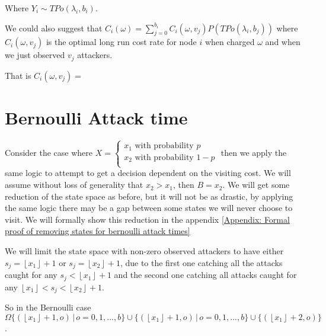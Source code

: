 \documentclass[a4paper,10pt]{article}
\newcommand{\floor}[1]{\left \lfloor #1 \right \rfloor}
\theoremstyle{definition}
\theoremstyle{definition}
\theoremstyle{remark}
\theoremstyle{definition}
\begin{document}
Where $Y_{i} \sim TPo(\lambda_{i},b_{i})$.

We could also suggest that $C_{i}(\omega)=\sum\limits_{j=0}^{b_{i}} C_{i}(\omega,v_{j}) P(TPo(\lambda_{i},b_{j}))$ where $C_{i}(\omega,v_{j})$ is the optimal long run cost rate for node $i$ when charged $\omega$ and when we just observed $v_{j}$ attackers.

That is $C_{i}(\omega,v_{j})=$

\section{Bernoulli Attack time}
Consider the case where $X=\begin{cases}
x_{1} \text{ with probability } p \\
x_{2} \text{ with probability } 1-p \\
\end{cases}$ then we apply the same logic to attempt to get a decision dependent on the visiting cost. We will assume without loss of generality that $x_{2} > x_{1}$, then $B=x_{2}$. We will get some reduction of the state space as before, but it will not be as drastic, by applying the same logic there may be a gap between some states we will never choose to visit.
We will formally show this reduction in the appendix \ref{Appendix: Formal proof of removing states for bernoulli attack times}

We will limit the state space with non-zero observed attackers to have either $s_{j}=\floor{x_{1}}+1$ or $s_{j}=\floor{x_{2}}+1$, due to the first one catching all the attacks caught for any $s_{j}<\floor{x_{1}}+1$ and the second one catching all attacks caught for any $\floor{x_{1}}<s_{j}<\floor{x_{2}}+1$.

So in the Bernoulli case $\Omega \{(\floor{x_{1}}+1,o) \, | \, o=0,1,...,b \} \cup \{(\floor{x_{1}}+1,o) \, | \, o=0,1,...,b \} \cup \{(\floor{x_{1}}+2,o) \}$.
\end{document}

